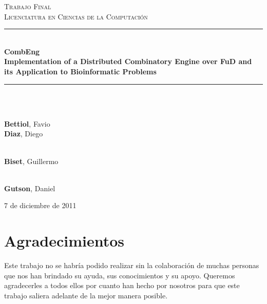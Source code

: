 \documentclass[a4paper,12pt,english]{report}
\theoremstyle{definition}
\newcommand{\HRule}{\rule{\linewidth}{0.3mm}}
\begin{document}
\begin{titlepage}
\begin{center}
        \vspace{3cm}
        
        \textsc{\small{Trabajo Final}}\\
        \textsc{\footnotesize{Licenciatura en Ciencias de la Computaci\'on}}\\
        
        \HRule\\[0.1cm]
        \textbf{\Large{CombEng}\\[0.3cm]
                \large Implementation of a Distributed Combinatory Engine over FuD and its Application to Bioinformatic Problems}\\[0.1cm]
        \HRule\\[0.4cm]

        \vspace{3.5cm}

        \begin{normalsize}
            \\
            \textbf{Bettiol}, Favio\\
            \textbf{Diaz}, Diego
        \end{normalsize}
            
        \vspace{.5cm}
        
        \begin{minipage}{0.4\textwidth}
            \begin{center}
                 \\
                \large{\textbf{Biset}, Guillermo}
            \end{center}
        \end{minipage}
        \begin{minipage}{0.4\textwidth}
            \begin{flushright} 
             \\
            \large{\textbf{Gutson}, Daniel}
            \end{flushright}
        \end{minipage}

        \vfill
        {\large 7 de diciembre de 2011}
    \end{center}

\end{titlepage}

\newpage
\thispagestyle{empty}
\mbox{}
\chapter*{Agradecimientos}
Este trabajo no se habr\'ia podido realizar sin la colaboraci\'on de muchas personas que nos han brindado su ayuda, sus conocimientos y su apoyo. Queremos agradecerles a todos ellos por cuanto han hecho por nosotros para que este trabajo saliera adelante de la mejor manera posible.
\end{document}
